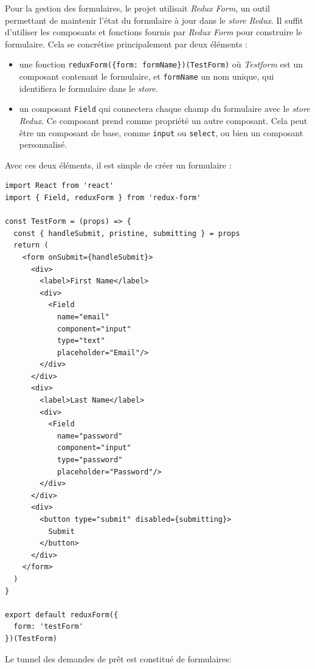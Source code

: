 \bigskip

Pour la gestion des formulaires, le projet utilisait \emph{Redux Form},
un outil permettant de maintenir l'état du formulaire à jour dans le
\emph{store Redux}. Il suffit d'utiliser les composants et fonctions
fournis par \emph{Redux Form} pour construire le formulaire. Cela se
concrétise principalement par deux éléments :

\begin{itemize}
\tightlist
\item
  une fonction
  \texttt{reduxForm(\{form:\ \textquotesingle{}formName\textquotesingle{}\})(TestForm)}
  où \emph{Testform} est un composant contenant le formulaire, et
  \texttt{formName} un nom unique, qui identifiera le formulaire dans le
  \emph{store}.
\item
  un composant \texttt{Field} qui connectera chaque champ du formulaire
  avec le \emph{store Redux}. Ce composant prend comme propriété un
  autre composant. Cela peut être un composant de base, comme
  \texttt{input} ou \texttt{select}, ou bien un composant personnalisé.
\end{itemize}

Avec ces deux éléments, il est simple de créer un formulaire :

\begin{verbatim}
import React from 'react'
import { Field, reduxForm } from 'redux-form'

const TestForm = (props) => {
  const { handleSubmit, pristine, submitting } = props
  return (
    <form onSubmit={handleSubmit}>
      <div>
        <label>First Name</label>
        <div>
          <Field
            name="email"
            component="input"
            type="text"
            placeholder="Email"/>
        </div>
      </div>
      <div>
        <label>Last Name</label>
        <div>
          <Field
            name="password"
            component="input"
            type="password"
            placeholder="Password"/>
        </div>
      </div>
      <div>
        <button type="submit" disabled={submitting}>
          Submit
        </button>
      </div>
    </form>
  )
}

export default reduxForm({
  form: 'testForm'
})(TestForm)
\end{verbatim}

\bigskip

Le tunnel des demandes de prêt est constitué de formulaires:

